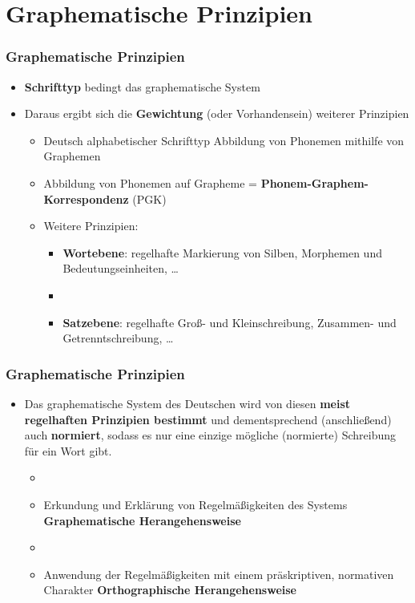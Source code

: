 \section{Graphematische Prinzipien}


\begin{frame}
\frametitle{Graphematische Prinzipien}

\begin{itemize}
	\item \textbf{Schrifttyp} bedingt das graphematische System
	\item Daraus ergibt sich die \textbf{Gewichtung} (oder Vorhandensein) weiterer
Prinzipien

	\begin{itemize}
		\item Deutsch \ras alphabetischer Schrifttyp \ras Abbildung von
Phonemen mithilfe von Graphemen
		\item Abbildung von Phonemen auf Grapheme = \textbf{Phonem-Graphem-
Korrespondenz} (PGK)
		\item Weitere Prinzipien:
		
		\begin{itemize}
			\item \textbf{Wortebene}: regelhafte Markierung von Silben, Morphemen und
Bedeutungseinheiten, \dots
			\item[]
			\item \textbf{Satzebene}: regelhafte Groß- und Kleinschreibung, Zusammen- und Getrenntschreibung, \dots
		\end{itemize}
	\end{itemize}
\end{itemize}
\end{frame}



\begin{frame}
\frametitle{Graphematische Prinzipien}

\begin{itemize}
	\item Das graphematische System des Deutschen wird von diesen
\textbf{meist regelhaften Prinzipien bestimmt} und dementsprechend
(anschließend) auch \textbf{normiert}, sodass es nur eine einzige
mögliche (normierte) Schreibung für ein Wort gibt.

	\begin{itemize}
		\item[]
		\item Erkundung und Erklärung von Regelmäßigkeiten des Systems \ras
\textbf{Graphematische Herangehensweise}
		\item[]
		\item Anwendung der Regelmäßigkeiten mit einem präskriptiven,
normativen Charakter \ras \textbf{Orthographische Herangehensweise}
	\end{itemize}
\end{itemize}
\end{frame}



